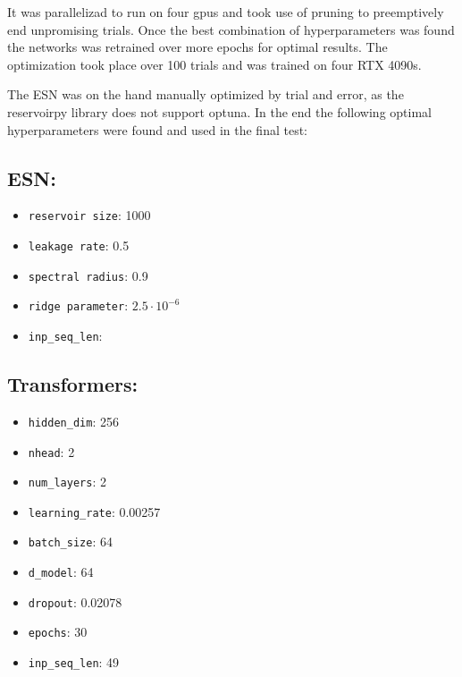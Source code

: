 \documentclass[11pt]{article}
\begin{document}
It was parallelizad to run on four gpus and took use of pruning to preemptively end unpromising trials. Once the best combination of hyperparameters was found the networks was retrained over more epochs for optimal results. The optimization took place over 100 trials and was trained on four RTX 4090s.

The ESN was on the hand manually optimized by trial and error, as the reservoirpy library does not support optuna. In the end the following optimal hyperparameters were found and used in the final test:

\raggedcolumns
\begin{multicols}{3}
    \subsection*{ESN:}
    \begin{itemize}
        \item \texttt{reservoir size}: 1000
        \item \texttt{leakage rate}: 0.5
        \item \texttt{spectral radius}: 0.9
        \item \texttt{ridge parameter}: \(2.5 \cdot 10^{-6}\)
        \item \texttt{inp\_seq\_len}:  
    \end{itemize}

    \subsection*{Transformers:}
    \begin{itemize}
        \item \texttt{hidden\_dim}: 256
        \item \texttt{nhead}: 2
        \item \texttt{num\_layers}: 2
        \item \texttt{learning\_rate}: 0.00257 %
        \item \texttt{batch\_size}: 64
        \item \texttt{d\_model}: 64
        \item \texttt{dropout}: 0.02078 %
        \item \texttt{epochs}: 30
        \item \texttt{inp\_seq\_len}: 49
    \end{itemize}


\end{multicols}
\end{document}
